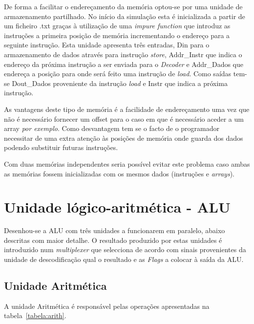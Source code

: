 De forma a facilitar o endereçamento da memória optou-se por uma unidade de armazenamento partilhado. No início da simulação esta é inicializada a partir de um ficheiro .txt graças à utilização de uma \textit{impure function} que introduz as instruções a primeira posição de memória incrementando o endereço para a seguinte instrução. 
Esta unidade apresenta três entradas, Din para o armazenamento de dados através para instrução \textit{store}, Addr\_Instr que indica o endereço da próxima instrução a ser enviada para o \textit{Decoder} e Addr\_Dados que endereça a posição para onde será feito uma instrução de \textit{load}.
Como saídas tem-se Dout\_Dados proveniente da instrução \textit{load} e Instr que indica a próxima instrução.

As vantagens deste tipo de memória é a facilidade de endereçamento uma vez que não é necessário fornecer um offset para o caso em que é necessário aceder a um array \textit{por exemplo}. Como desvantagem tem se o facto de o programador necessitar de uma extra atenção às posições de memória onde guarda dos dados podendo substituir futuras instruções.

Com duas memórias independentes seria possível evitar este problema caso ambas as memórias fossem inicializadas com os mesmos dados (instruções e \textit{arrays}).

\section{Unidade lógico-aritmética - ALU}

Desenhou-se a ALU com três unidades a funcionarem em paralelo, abaixo descritas com maior detalhe.
O resultado produzido por estas unidades é introduzido num \textit{multiplexer} que selecciona de acordo com sinais provenientes da unidade de descodificação qual o resultado e as \textit{Flags} a colocar à saída da ALU.


\subsection{Unidade Aritmética}
A unidade Aritmética é responsável pelas operações apresentadas na tabela~\ref{tabela:arith}.

